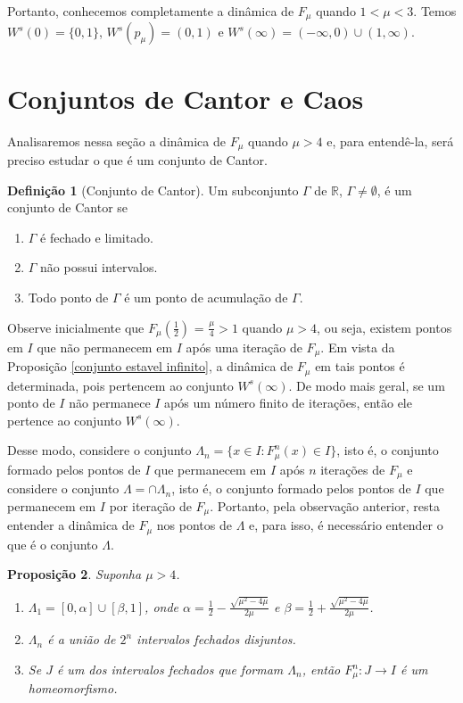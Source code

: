 \documentclass[a4paper, 12pt]{article}
\theoremstyle{definition}
\newtheorem{definition}{Definição}[section]
\theoremstyle{plain}
\newtheorem{proposition}[definition]{Proposição}
\theoremstyle{plain}
\theoremstyle{plain}
\theoremstyle{remark}
\newcommand{\RR}{\mathbb{R}}
\begin{document}
Portanto, conhecemos completamente a dinâmica de $F_\mu$ quando $1 < \mu < 3$. Temos $W^s(0) = \{0, 1\}$, $W^s(p_\mu) = (0, 1)$ e $W^s(\infty) = (-\infty, 0) \cup (1, \infty)$.

\section{Conjuntos de Cantor e Caos}

Analisaremos nessa seção a dinâmica de $F_\mu$ quando $\mu > 4$ e, para entendê-la, será preciso estudar o que é um conjunto de Cantor.

\begin{definition}[Conjunto de Cantor]
Um subconjunto $\Gamma$ de $\RR$, $\Gamma \neq \emptyset$, é um conjunto de Cantor se
\begin{enumerate}
\item $\Gamma$ é fechado e limitado.
\item $\Gamma$ não possui intervalos.
\item Todo ponto de $\Gamma$ é um ponto de acumulação de $\Gamma$.
\end{enumerate}
\end{definition}

Observe inicialmente que $F_\mu(\frac{1}{2})$ = $\frac{\mu}{4} > 1$ quando $\mu > 4$, ou seja, existem pontos em $I$ que não permanecem em $I$ após uma iteração de $F_\mu$. Em vista da Proposição \ref{conjunto estavel infinito}, a dinâmica de $F_\mu$ em tais pontos é determinada, pois pertencem ao conjunto $W^s(\infty)$. De modo mais geral, se um ponto de $I$ não permanece $I$ após um número finito de iterações, então ele pertence ao conjunto $W^s(\infty)$. 

Desse modo, considere o conjunto $\Lambda_n = \{x \in I : F^n_\mu (x) \in I\}$, isto é, o conjunto formado pelos pontos de $I$ que permanecem em $I$ após $n$ iterações de $F_\mu$ e considere o conjunto $\Lambda = \cap \Lambda_n$, isto é, o conjunto formado pelos pontos de $I$ que permanecem em $I$ por iteração de $F_\mu$. Portanto, pela observação anterior, resta entender a dinâmica de $F_\mu$ nos pontos de $\Lambda$ e, para isso, é necessário entender o que é o conjunto $\Lambda$.

\begin{proposition}
\label{proposition 4}
Suponha $\mu > 4$.
\begin{enumerate}
\item $\Lambda_1 = [0, \alpha] \cup [\beta, 1]$, onde $\alpha = \frac{1}{2} - \frac{\sqrt{\mu^2 - 4\mu}}{2\mu}$ e $\beta = \frac{1}{2} + \frac{\sqrt{\mu^2 - 4\mu}}{2\mu}$.
\item $\Lambda_n$ é a união de $2^n$ intervalos fechados disjuntos.
\item Se $J$ é um dos intervalos fechados que formam $\Lambda_n$, então $F^n_\mu: J \rightarrow I$ é um homeomorfismo.
\end{enumerate}
\end{proposition}
\end{document}
